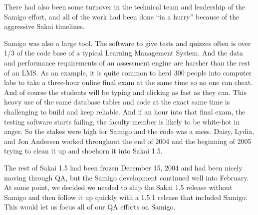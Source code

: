 \documentclass[12pt]{book}
\begin{document}
There had also been some turnover in the technical team
and leadership of the Samigo effort, and all of the work
had been done ``in a hurry'' because of the aggressive
Sakai timelines.

Samigo was also a large tool.  The software to give tests and
quizzes often is over 1/3 of the code base of a typical
Learning Management System.  And the data and performance
requirements of an assessment engine are harsher
than the rest of an LMS.  As an example, it is quite common
to herd 300 people into computer labs to take a three-hour
online final exam at the same time so no one can cheat.
And of course the students will be typing and clicking
as fast as they can.  This heavy use of the same database
tables and code at the exact same time is challenging
to build and keep reliable.  And if an hour into that final
exam, the testing software starts failing, the faculty member
is likely to be white-hot in anger.
So the stakes were high for Samigo and the code
was a mess.  Daisy, Lydia, and Jon Andersen worked
throughout the end of 2004 and the beginning of 2005
trying to clean it up and shoehorn it into Sakai 1.5.

The rest of Sakai 1.5 had been frozen December 15, 2004
and had been nicely moving through QA, but the Samigo
development continued well into February.   At some point,
we decided we needed to ship the Sakai 1.5 release
without Samigo and then follow it up quickly with a
1.5.1 release that included Samigo.   This would let us
focus all of our QA efforts on Samigo.
\end{document}
